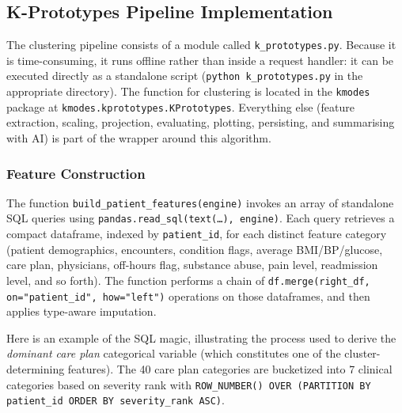 \subsection{K-Prototypes Pipeline Implementation}

The clustering pipeline consists of a module called \texttt{k\_prototypes.py}. Because it is time-consuming, it runs offline rather than inside a request handler: it can be executed directly as a standalone script (\texttt{python k\_prototypes.py} in the appropriate directory). The function for clustering is located in the \texttt{kmodes} package at \texttt{kmodes.kprototypes.KPrototypes}. Everything else (feature extraction, scaling, projection, evaluating, plotting, persisting, and summarising with AI) is part of the wrapper around this algorithm.

\subsubsection*{Feature Construction}
\label{ch:feature_construction}

The function \texttt{build\_patient\_features(engine)} invokes an array of standalone SQL queries using \texttt{pandas.read\_sql(text(\dots), engine)}. Each query retrieves a compact dataframe, indexed by \texttt{patient\_id}, for each distinct feature category (patient demographics, encounters, condition flags, average BMI/BP/glucose, care plan, physicians, off-hours flag, substance abuse, pain level, readmission level, and so forth). The function performs a chain of \texttt{df.merge(right\_df, on="patient\_id", how="left")} operations on those dataframes, and then applies type-aware imputation.

Here is an example of the SQL magic, illustrating the process used to derive the \emph{dominant care plan} categorical variable (which constitutes one of the cluster-determining features). The 40 care plan categories are bucketized into 7 clinical categories based on severity rank with \texttt{ROW\_NUMBER() OVER (PARTITION BY patient\_id ORDER BY severity\_rank ASC)}.

